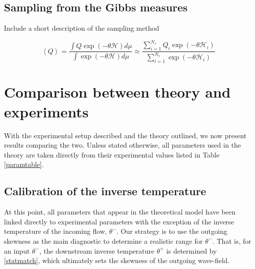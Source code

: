 \documentclass[11pt]{article}
\newcommand{\nick}[1]{{\color{red} #1}}
\newcommand{\mean}[1]{\left< #1 \right>}
\newcommand{\eps}{\varepsilon}
\newcommand{\drat}{\mathcal{D}}
\newcommand{\dratdn}{\drat_+}
\newcommand{\epsup}{\eps_0}
\newcommand{\delup}{\delta_0}
\newcommand{\Ham}{\mathcal{H}}
\newcommand{\thup}{\theta^{-}}
\newcommand{\thdn}{\theta^{+}}
\newcommand{\Nsamp}{N_s}
\newcommand{\sumsamp}{\sum_{i=1}^{\Nsamp}}
\begin{document}
\subsection{Sampling from the Gibbs measures}

\nick{Include a short description of the sampling method}

\begin{equation}
\mean{Q} = \frac{\int Q \exp\left(-\theta \Ham \right) d\mu}{ \int \exp\left(-\theta \Ham \right) d\mu}
\approx \frac{\sumsamp Q_i \exp(-\theta \Ham_i)} {\sumsamp \exp(-\theta \Ham_i)}
\end{equation}


\section{Comparison between theory and experiments}

With the experimental setup described and the theory outlined, we now present results comparing the two. Unless stated otherwise, all parameters used in the theory are taken directly from their experimental values listed in Table \ref{paramtable}. 

\subsection{Calibration of the inverse temperature}

At this point, all parameters that appear in the theoretical model have been linked directly to experimental parameters with the exception of the inverse temperature of the incoming flow, $\thup$.
Our strategy is to use the outgoing skewness as the main diagnostic to determine a realistic range for $\thup$. That is, for an input $\thup$, the downstream inverse temperature $\thdn$ is determined by \eqref{statmatch}, which ultimately sets the skewness of the outgoing wave-field.
\end{document}
